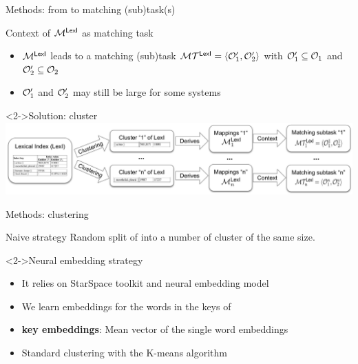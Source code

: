 \documentclass[t]{beamer}
\begin{document}
\begin{frame}{Methods: from \lex to matching (sub)task(s)}

\begin{block}{Context of $\mathcal{M}^{\textsf{LexI}}$ as matching task}

\begin{itemize}
  \item $\mathcal{M}^{\textsf{LexI}}$ leads to a matching (sub)task $\mathcal{M}\mathcal{T}^{\textsf{LexI}}=\langle \mathcal{O}_1', \mathcal{O}_2' \rangle$
with $\mathcal{O}_1' \subseteq \mathcal{O}_1$ and $\mathcal{O}_2' \subseteq \mathcal{O}_2$
  \item $\mathcal{O}_1'$ and $\mathcal{O}_2'$ may still be large for some systems 
\end{itemize}

\end{block}


\begin{block}<2->{Solution: cluster \lex}
\includegraphics[width=1.0\textwidth]{figures/workflow_clustering.png}
\end{block}

\end{frame}



\begin{frame}{Methods: clustering}
	
	\begin{block}{Naive strategy}
		Random split of \lex into a number of cluster of the same size.
	\end{block}
	
	
	\begin{block}<2->{Neural embedding strategy}
	\begin{itemize}
	  \item It relies on StarSpace toolkit and neural embedding model
	  \item We learn embeddings for the words in the keys of \lex
	  \item \textbf{\lex key embeddings}: Mean vector of the single word 
	  embeddings 
	  \item Standard clustering with the K-means algorithm
	\end{itemize}
	
	\end{block}
	
	
  	
\end{frame}
\end{document}
